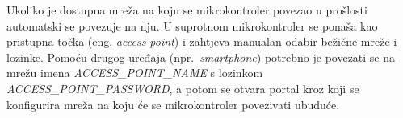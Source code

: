 Ukoliko je dostupna mreža na koju se mikrokontroler povezao u prošlosti automatski se povezuje na nju.
U suprotnom mikrokontroler se ponaša kao pristupna točka (eng. \textit{access point}) i zahtjeva manualan odabir
bežične mreže i lozinke.
Pomoću drugog uređaja (npr.~\textit{smartphone}) potrebno je povezati se na mrežu imena \textit{ACCESS\_POINT\_NAME} s
lozinkom \textit{ACCESS\_POINT\_PASSWORD}, a potom se otvara portal kroz koji se konfigurira mreža na koju će se
mikrokontroler povezivati ubuduće.

